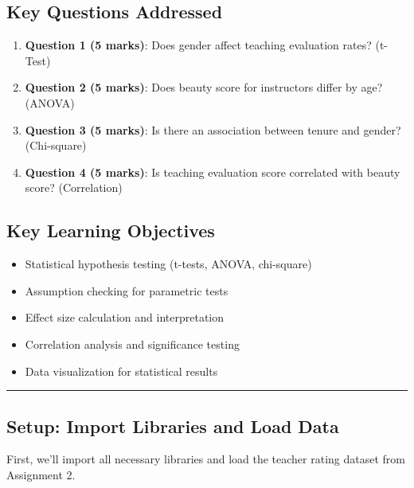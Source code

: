 \documentclass[11pt]{article}
\providecommand{\tightlist}{%
      \setlength{\itemsep}{0pt}\setlength{\parskip}{0pt}}
\begin{document}
\subsection{\texorpdfstring{\textbf{Key Questions
Addressed}}{Key Questions Addressed}}\label{key-questions-addressed}

\begin{enumerate}
\def\labelenumi{\arabic{enumi}.}
\tightlist
\item
  \textbf{Question 1 (5 marks)}: Does gender affect teaching evaluation
  rates? (t-Test)
\item
  \textbf{Question 2 (5 marks)}: Does beauty score for instructors
  differ by age? (ANOVA)
\item
  \textbf{Question 3 (5 marks)}: Is there an association between tenure
  and gender? (Chi-square)
\item
  \textbf{Question 4 (5 marks)}: Is teaching evaluation score correlated
  with beauty score? (Correlation)
\end{enumerate}

\subsection{\texorpdfstring{\textbf{Key Learning
Objectives}}{Key Learning Objectives}}\label{key-learning-objectives}

\begin{itemize}
\tightlist
\item
  Statistical hypothesis testing (t-tests, ANOVA, chi-square)
\item
  Assumption checking for parametric tests
\item
  Effect size calculation and interpretation
\item
  Correlation analysis and significance testing
\item
  Data visualization for statistical results
\end{itemize}

\begin{center}\rule{0.5\linewidth}{0.5pt}\end{center}

    \subsection{Setup: Import Libraries and Load
Data}\label{setup-import-libraries-and-load-data}

First, we'll import all necessary libraries and load the teacher rating
dataset from Assignment 2.
\end{document}
